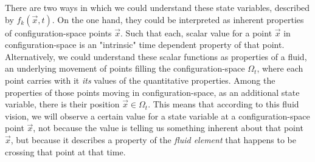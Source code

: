 \documentclass[11pt, a4paper]{article} %
\begin{document}
There are two ways in which we could understand these state variables, described by $f_k(\vec{x},t)$. On the one hand, they could be interpreted as inherent properties of configuration-space points $\vec{x}$. Such that each, scalar value for a point $\vec{x}$ in configuration-space is an "intrinsic" time dependent property of that point. Alternatively, we could understand these scalar functions as properties of a fluid, an underlying movement of points filling the configuration-space $\Omega_t$, where each point carries with it {\em its} values of the quantitative properties. Among the properties of those points moving in configuration-space, as an additional state variable, there is their position $\vec{x}\in\Omega_t$. This means that according to this fluid vision, we will observe a certain value for a state variable at a configuration-space point $\vec{x}$, not because the value is telling us something inherent about that point $\vec{x}$, but because it describes a property of the {\em fluid element} that happens to be crossing that point at that time.
\end{document}
